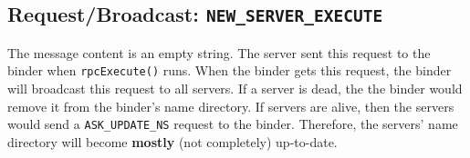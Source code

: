 \subsection{Request/Broadcast: \tt NEW\_SERVER\_EXECUTE}
The message content is an empty string.
The server sent this request to the binder when {\tt rpcExecute()} runs.
When the binder gets this request, the binder will broadcast this request to all servers.
If a server is dead, the the binder would remove it from the binder's name directory.
If servers are alive, then the servers would send a {\tt ASK\_UPDATE\_NS} request to the binder.
Therefore, the servers' name directory will become {\bf mostly} (not completely) up-to-date.
